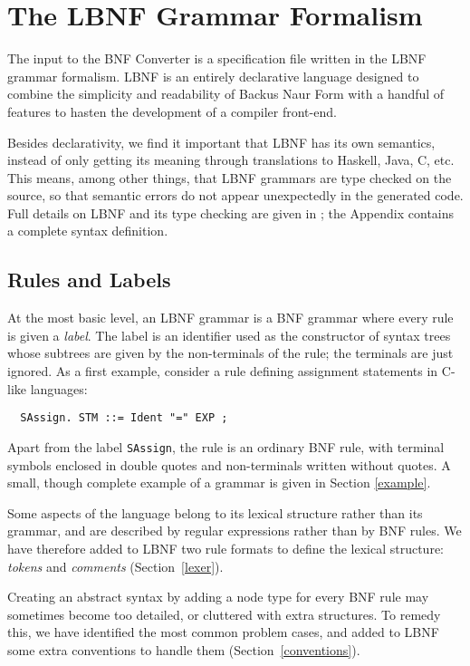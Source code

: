 \section{The LBNF Grammar Formalism}

\label{lbnf}

The input to the BNF Converter is a specification file written in the 
LBNF grammar formalism. LBNF is an entirely declarative 
language designed to combine the simplicity and readability of 
Backus Naur Form with a handful of features to hasten the development of 
a compiler front-end.

Besides declarativity, we find it important that LBNF has its
own semantics, instead of only getting its meaning through
translations to Haskell, Java, C, etc. This means, among other
things, that LBNF grammars are type checked on the source,
so that semantic errors do not appear unexpectedly in the generated
code. Full details on LBNF and its type checking are given in \cite{bnfc};
the Appendix contains a complete syntax definition.



\subsection{Rules and Labels}

At the most basic level, an LBNF grammar is a BNF grammar where 
every rule is given a {\em label}. The label is an identifier 
used as the constructor of syntax trees whose subtrees are 
given by the non-terminals of the rule; the terminals are just ignored.
As a first example, 
consider a rule defining assignment statements in C-like languages:
\begin{verbatim}
  SAssign. STM ::= Ident "=" EXP ;
\end{verbatim}
Apart from the label {\tt SAssign},
the rule is an ordinary BNF rule, with terminal symbols enclosed in
double quotes and non-terminals written without quotes. A small, though 
complete example of a grammar is given in Section \ref{example}.

Some aspects of the language belong to its lexical
structure rather than its grammar, and are described by
regular expressions rather than by BNF rules. We have therefore
added to LBNF two rule formats to define the lexical structure: 
{\em tokens} and {\em comments} (Section~\ref{lexer}).

Creating an abstract syntax by adding a node type for every BNF rule
may sometimes become too detailed, 
or cluttered with extra structures. 
To remedy this, we have identified the most common problem cases, 
and added to LBNF
some extra conventions to handle them (Section~\ref{conventions}).

